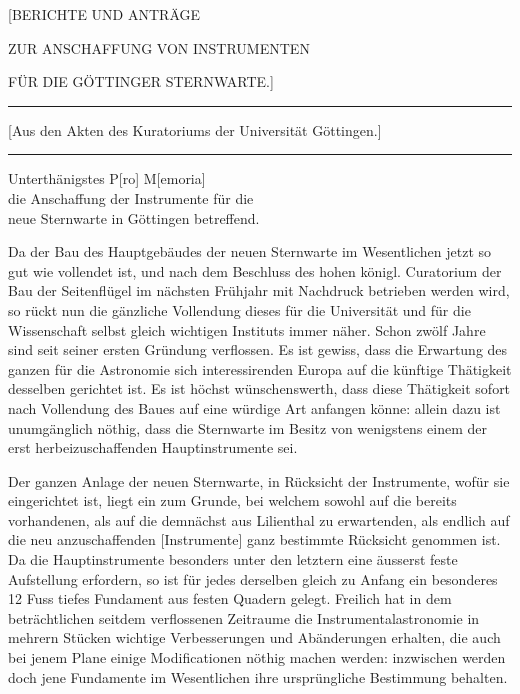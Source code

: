 \clearpage\begingroup

\NoSourceHead
\begin{center}{\Large [BERICHTE UND ANTRÄGE\par
ZUR ANSCHAFFUNG VON INSTRUMENTEN\par
FÜR DIE GÖTTINGER STERNWARTE.]}\par\medskip
\rule{.80\textwidth}{.35pt}\par
{\small [Aus den Akten des Kuratoriums der Universität Göttingen.]}\par
\rule{.80\textwidth}{.35pt}\par\medskip
[I.]\end{center}
\noindent\hspace*{\parindent}Unterthänigstes P[ro] M[emoria]\\
die Anschaffung der Instrumente für die\\
neue Sternwarte in Göttingen betreffend.

Da der Bau des Hauptgebäudes der neuen Sternwarte im Wesentlichen jetzt so gut wie vollendet ist, und nach dem Beschluss des hohen königl. Curatorium der Bau der Seitenflügel im nächsten Frühjahr mit Nachdruck betrieben werden wird, so rückt nun die gänzliche Vollendung dieses für die Universität und für die Wissenschaft selbst gleich wichtigen Instituts immer näher. Schon zwölf Jahre sind seit seiner ersten Gründung verflossen. Es ist gewiss, dass die Erwartung des ganzen für die Astronomie sich interessirenden Europa auf die künftige Thätigkeit desselben gerichtet ist. Es ist höchst wünschenswerth, dass diese Thätigkeit sofort nach Vollendung des Baues auf eine würdige Art anfangen könne: allein dazu ist unumgänglich nöthig, dass die Sternwarte im Besitz von wenigstens einem der erst herbeizuschaffenden Hauptinstrumente sei.

Der ganzen Anlage der neuen Sternwarte, in Rücksicht der Instrumente, wofür sie eingerichtet ist, liegt ein  zum Grunde, bei welchem sowohl auf die bereits vorhandenen, als auf die demnächst aus
\clearpage{}
\noindent Lilienthal zu erwartenden, als endlich auf die neu anzuschaffenden [Instrumente] ganz bestimmte Rücksicht genommen ist. Da die Hauptinstrumente besonders unter den letztern eine äusserst feste Aufstellung erfordern, so ist für jedes derselben gleich zu Anfang ein besonderes 12 Fuss tiefes Fundament aus festen Quadern gelegt. Freilich hat in dem beträchtlichen seitdem verflossenen Zeitraume die Instrumentalastronomie in mehrern Stücken wichtige Verbesserungen und Abänderungen erhalten, die auch bei jenem Plane einige Modificationen nöthig machen werden: inzwischen werden doch jene Fundamente im Wesentlichen ihre ursprüngliche Bestimmung behalten.

